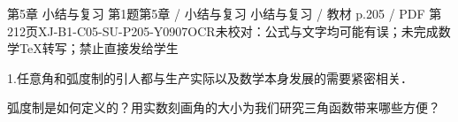 \begin{bankitem}{第5章 小结与复习 第1题}{第5章 / 小结与复习 小结与复习 / 教材 p.205 / PDF 第212页}{XJ-B1-C05-SU-P205-Y0907}{OCR未校对：公式与文字均可能有误；未完成数学TeX转写；禁止直接发给学生}
\begin{ocrdraft}
\par
1.任意角和弧度制的引人都与生产实际以及数学本身发展的需要紧密相关．
\par
弧度制是如何定义的？用实数刻画角的大小为我们研究三角函数带来哪些方便？
\end{ocrdraft}
\end{bankitem}
